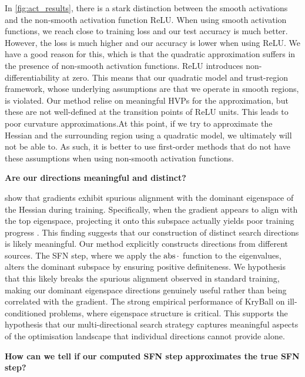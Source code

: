 In \cref{fig:act_results}, there is a stark distinction between the smooth activations and the non-smooth activation function ReLU. When using smooth activation functions, we reach close to training loss and our test accuracy is much better. However, the loss is much higher and our accuracy is lower when using ReLU. We have a good reason for this, which is that the quadratic approximation suffers in the presence of non-smooth activation functions. ReLU introduces non-differentiability at zero. This means that our quadratic model and trust-region framework, whose underlying assumptions are that we operate in smooth regions, is violated. Our method relise on meaningful HVPs for the approximation, but these are not well-defined at the transition points of ReLU units. This leads to poor curvature approximations.At this point, if we try to approximate the Hessian and the surrounding region using a quadratic model, we ultimately will not be able to. As such, it is better to use first-order methods that do not have these assumptions when using non-smooth activation functions. 

\textbf{Are our directions meaningful and distinct?}

\cite{tinysubspaces} show that gradients exhibit spurious alignment with the dominant eigenspace of the Hessian during training. Specifically, when the gradient appears to align with the top eigenspace, projecting it onto this subspace actually yields poor training progress \cite{tinysubspaces}. This finding suggests that our construction of distinct search directions is likely meaningful. Our method explicitly constructs directions from different sources. The SFN step, where we apply the $\operatorname{abs}{\cdot}$ function to the eigenvalues, alters the dominant subspace by ensuring positive definiteness. We hypothesis that this likely breaks the spurious alignment observed in standard training, making our dominant eigenspace directions genuinely useful rather than being correlated with the gradient. The strong empirical performance of KryBall on ill-conditioned problems, where eigenspace structure is critical. This supports the hypothesis that our multi-directional search strategy captures meaningful aspects of the optimisation landscape that individual directions cannot provide alone.

\textbf{How can we tell if our computed SFN step approximates the true SFN step?}

